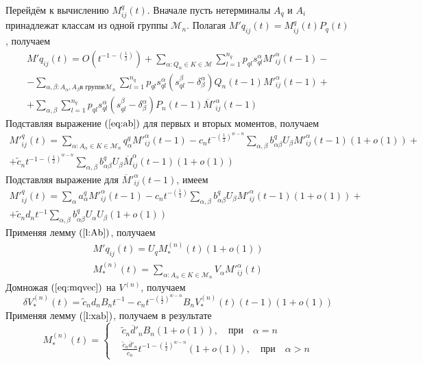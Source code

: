\documentclass[12pt]{article}
\begin{document}
Перейдём к вычислению $M^q_{ij}(t)$. Вначале пусть нетерминалы $A_q$ и $A_i$ принадлежат классам из одной группы $\mathcal{M}_n$. Полагая $M'q_{ij}(t) = M^q_{ij}(t) P_q(t)$, получаем
\begin{multline*}
	M'q_{ij}(t) = O(t^{-1 -\left(\frac{1}{2}\right)}) + \sum_{\alpha : Q_\alpha \in K \in \mathcal{M}} \sum_{l=1}^{n_q} p_{ql} s_{ql}^\alpha M'^\alpha_{ij}(t-1) - \\
	- \sum_{\alpha,\beta : A_\alpha, A_\beta \text{в группе} \mathcal{M}_n} \sum_{l=1}^{n_q} p_{ql} s_{ql}^\alpha (s_{ql}^\beta - \delta^\alpha_\beta) Q_n(t-1) M'^\alpha_{ij}(t-1) + \\
	+ \sum_{\alpha,\beta} \sum_{l=1}^{n_q} p_{ql} s_{ql}^\alpha (s_{ql}^\beta - \delta^\alpha_\beta) P_n(t-1) \overline{M}'^\alpha_{ij}(t-1)
\end{multline*}
Подставляя выражение $(\ref{eq:ab})$ для первых и вторых моментов, получаем
\begin{multline*}
	M'^q_{ij}(t) = \sum_{\alpha : A_\alpha \in K \in \mathcal{M}_n} q^q_\alpha M'^\alpha_{ij}(t-1) - c_n t^{-\left(\frac{1}{2}\right)^{w-n}} \sum_{\alpha,\beta} b^q_{\alpha \beta} U_\beta M'^\alpha_{ij}(t-1) (1 + o(1)) + \\
	+ \tilde{c}_n t^{-1 - \left(\frac{1}{2}\right)^{w-n}} \sum_{\alpha,\beta} b^q_{\alpha \beta} U_\beta \overline{M}^\alpha_{ij}(t-1) (1 + o(1))
\end{multline*}
Подставляя выражение для $\overline{M}'^\alpha_{ij}(t-1)$, имеем
\begin{multline}
\label{eq:mqvec}
	M'^q_{ij}(t) = \sum_{\alpha} a^q_\alpha M'^\alpha_{ij}(t-1) - c_n t^{-\left(\frac{1}{2}\right)} \sum_{\alpha,\beta} b^q_{\alpha \beta} U_\beta M'^\alpha_{ij}(t-1) (1 + o(1)) + \\
	+ \tilde{c}_n d_n t^{-1} \sum_{\alpha,\beta} b^q_{\alpha \beta} U_\alpha U_\beta (1 + o(1))
\end{multline}
Применяя лемму $(\ref{l:Ab})$, получаем
\begin{equation*}
	\begin{split}
		M'q_{ij}(t) = U_q M^{(n)}_*(t) (1 + o(1)) \\
		M^{(n)}_*(t) = \sum_{\alpha : A_\alpha \in K \in \mathcal{M}_n} V_\alpha M'^\alpha_{ij}(t)
	\end{split}
\end{equation*}
Домножая $(\ref{eq:mqvec})$ на $V^{(n)}$, получаем
\begin{equation*}
	\delta V^{(n)}_*(t) = \tilde{c}_n d_n B_n t^{-1} - c_n t^{-\left(\frac{1}{2}\right)^{w-n}} B_n V^{(n)}_*(t)(t-1) (1 + o(1))
\end{equation*}
Применяя лемму $(\ref{l:xab})$, получаем в результате
\begin{equation*}
	M^{(n)}_*(t) = \left\{
	\begin{split}
		&\tilde{c}_n \overline{d}'_n B_n (1 + o(1)),\quad \text{при}\quad \alpha = n \\
		&\frac{\tilde{c}_n \overline{d}'_n}{c_n} t^{-1 -\left(\frac{1}{2}\right)^{w-n}} (1 + o(1)),\quad \text{при}\quad \alpha > n
	\end{split}
	\right.
\end{equation*}
\end{document}
